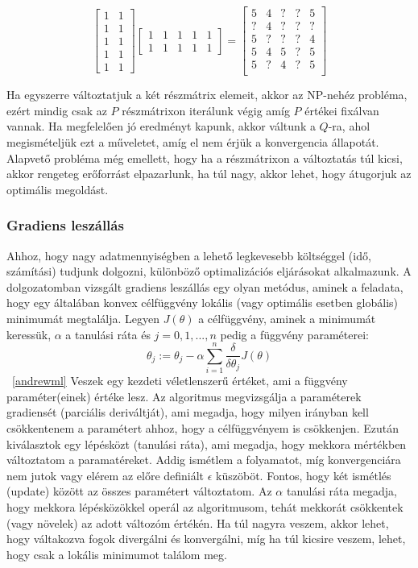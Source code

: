 \documentclass[a4paper,12pt]{article}
\begin{document}
\[
\begin{bmatrix}
    1 & 1 \\
    1 & 1  \\
    1 & 1  \\
    1 & 1  \\
    1 & 1          
\end{bmatrix}
%
\begin{bmatrix}
    1 & 1 & 1 & 1 & 1 \\
    1 & 1 & 1 & 1 & 1        
\end{bmatrix}
=
\begin{bmatrix}
    5 & 4 & ? & ? & 5\\
	? & 4 & ? & ? & ?\\
	5 & ? & ? & ? & 4\\
	5 & 4 & 5 & ? & 5\\
	5 & ? & 4 & ? & 5\\\end{bmatrix}
\] \linebreak

Ha egyszerre változtatjuk a két részmátrix elemeit, akkor az NP-nehéz probléma, ezért mindig csak az $P$ részmátrixon iterálunk végig amíg $P$ értékei fixálvan vannak. Ha megfelelően jó eredményt kapunk, akkor váltunk a $Q$-ra, ahol megismételjük ezt a műveletet, amíg el nem érjük a konvergencia állapotát. Alapvető probléma még emellett, hogy ha a részmátrixon a változtatás túl kicsi, akkor rengeteg erőforrást elpazarlunk, ha túl nagy, akkor lehet, hogy átugorjuk az optimális megoldást.

\subsubsection{Gradiens leszállás}

Ahhoz, hogy nagy adatmennyiségben a lehető legkevesebb költséggel (idő, számítási) tudjunk dolgozni, különböző optimalizációs eljárásokat alkalmazunk. A dolgozatomban vizsgált gradiens leszállás egy olyan metódus, aminek a feladata, hogy egy általában konvex célfüggvény lokális (vagy optimális esetben globális) minimumát megtalálja. Legyen $J(\theta)$ a célfüggvény, aminek a minimumát keressük, $\alpha$ a tanulási ráta és $j=0, 1, ..., n$ pedig a függvény paraméterei:
\[\theta_j:=\theta_j-\alpha\sum\limits_{i=1}^n\frac{\delta}{\delta\theta_j}J(\theta)\]~\ref{andrewml}
Veszek egy kezdeti véletlenszerű értéket, ami a függvény paraméter(einek) értéke lesz. Az algoritmus megvizsgálja a paraméterek gradiensét (parciális deriváltját), ami megadja, hogy milyen irányban kell csökkentenem a paramétert ahhoz, hogy a célfüggvényem is csökkenjen. Ezután kiválasztok egy lépésközt (tanulási ráta), ami megadja, hogy mekkora mértékben változtatom a paramatéreket. Addig ismétlem a folyamatot, míg konvergenciára nem jutok vagy elérem az előre definiált $\epsilon$ küszöböt. Fontos, hogy két ismétlés (update) között az összes paramétert változtatom. \linebreak
Az $\alpha$ tanulási ráta megadja, hogy mekkora lépésközökkel operál az algoritmusom, tehát mekkorát csökkentek (vagy növelek) az adott változóm értékén. Ha túl nagyra veszem, akkor lehet, hogy váltakozva fogok divergálni és konvergálni, míg ha túl kicsire veszem, lehet, hogy csak a lokális minimumot találom meg.
\end{document}
